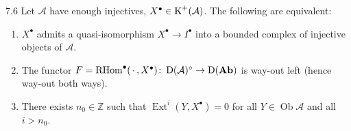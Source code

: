 \begin{bookproposition}{7.6}\label{prop:1.7.6}
Let $\mathcal{A}$ have enough injectives, $X^\bullet\in\operatorname{K}^+(\mathcal{A})$. The following are equivalent:
\begin{enumerate}
\item[(i)] $X^\bullet$ admits a quasi-isomorphism $X^\bullet\rightarrow I^\bullet$ into a bounded complex of injective objects of $\mathcal{A}$.
\item[(ii)] The functor $F=\operatorname{RHom}^\bullet(\,\cdot\,,X^\bullet)\colon\operatorname{D}(\mathcal{A})^\circ\to\operatorname{D}(\mathbf{Ab})$ is way-out left (hence way-out both ways).
\item[(iii)] There exists $n_0\in\mathbb{Z}$ such that $\operatorname{Ext}^i(Y,X^\bullet)=0$ for all $Y\in\operatorname{Ob}\mathcal{A}$ and all $i>n_0$.
\end{enumerate}
\end{bookproposition}

